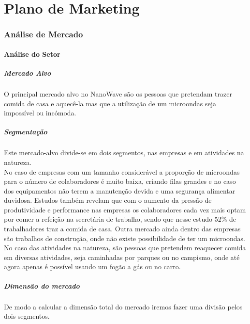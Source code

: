 \documentclass[a4paper]{article}
\begin{document}
\part{Plano de Marketing}
\section{Análise de Mercado}
\subsection{Análise do Setor}
\subsubsection{Mercado Alvo}
O principal mercado alvo no NanoWave são os pessoas que pretendam trazer comida de casa e aquecê-la mas que a utilização de um microondas seja impossível ou incómoda.
\subsubsection{Segmentação}
Este mercado-alvo divide-se em dois segmentos, nas empresas e em atividades na natureza.\\
No caso de empresas com um tamanho considerável a proporção de microondas para o número de colaboradores é muito baixa, criando filas grandes e no caso dos equipamentos não terem a manutenção devida e uma segurança alimentar duvidosa. Estudos também revelam que com o aumento da pressão de produtividade e performance nas empresas os colaboradores cada vez mais optam por comer a refeição na secretária de trabalho, sendo que nesse estudo 52\% de trabalhadores traz a comida de casa. Outra mercado ainda dentro das empresas são trabalhos de construção, onde não existe possibilidade de ter um microondas. \\
No caso das atividades na natureza, são pessoas que pretendem reaquecer comida em diversas atividades, seja caminhadas por parques ou no campismo, onde até agora apenas é possível usando um fogão a gás ou no carro.
\subsubsection{Dimensão do mercado}
De modo a calcular a dimensão total do mercado iremos fazer uma divisão pelos dois segmentos.
\end{document}
